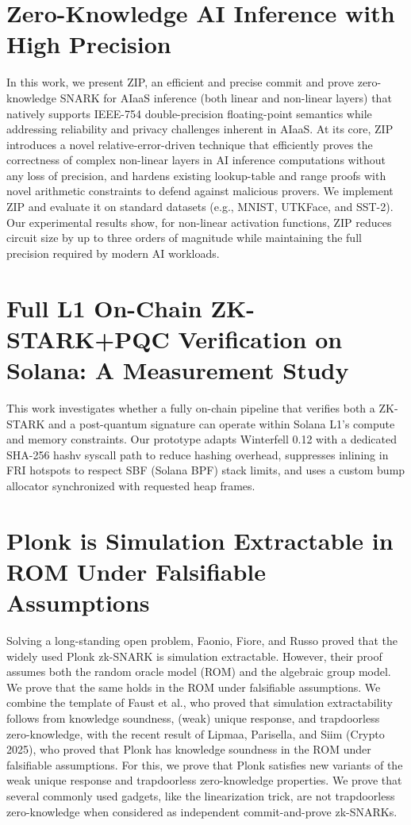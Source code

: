 \documentclass[11pt]{article}
\theoremstyle{definition}
\theoremstyle{remark}
\theoremstyle{plain}
\begin{document}
\section{\cite{cryptoeprint:2025/1732} Zero-Knowledge AI Inference with High Precision}
In this work, we present ZIP, an efficient and precise commit and prove zero-knowledge SNARK for AIaaS inference (both linear and non-linear layers) that natively supports IEEE-754 double-precision floating-point semantics while addressing reliability and privacy challenges inherent in AIaaS. At its core, ZIP introduces a novel relative-error-driven technique that efficiently proves the correctness of complex non-linear layers in AI inference computations without any loss of precision, and hardens existing lookup-table and range proofs with novel arithmetic constraints to defend against malicious provers. We implement ZIP and evaluate it on standard datasets (e.g., MNIST, UTKFace, and SST-2). Our experimental results show, for non-linear activation functions, ZIP reduces circuit size by up to three orders of magnitude while maintaining the full precision required by modern AI workloads.

\section{\cite{cryptoeprint:2025/1741} Full L1 On-Chain ZK-STARK+PQC Verification on Solana: A Measurement Study}
This work investigates whether a fully on-chain pipeline that verifies both a ZK-STARK and a post-quantum signature can operate within Solana L1's compute and memory constraints. Our prototype adapts Winterfell 0.12 with a dedicated SHA-256 hashv syscall path to reduce hashing overhead, suppresses inlining in FRI hotspots to respect SBF (Solana BPF) stack limits, and uses a custom bump allocator synchronized with requested heap frames. 

\section{\cite{cryptoeprint:2025/1759} Plonk is Simulation Extractable in ROM Under Falsifiable Assumptions}
Solving a long-standing open problem, Faonio, Fiore, and Russo proved that the widely used Plonk zk-SNARK is simulation extractable. However, their proof assumes both the random oracle model (ROM) and the algebraic group model. We prove that the same holds in the ROM under falsifiable assumptions. We combine the template of Faust et al., who proved that simulation extractability follows from knowledge soundness, (weak) unique response, and trapdoorless zero-knowledge, with the recent result of Lipmaa, Parisella, and Siim (Crypto 2025), who proved that Plonk has knowledge soundness in the ROM under falsifiable assumptions. For this, we prove that Plonk satisfies new variants of the weak unique response and trapdoorless zero-knowledge properties. We prove that several commonly used gadgets, like the linearization trick, are not trapdoorless zero-knowledge when considered as independent commit-and-prove zk-SNARKs.


%
%
\printbibliography
\end{document}
